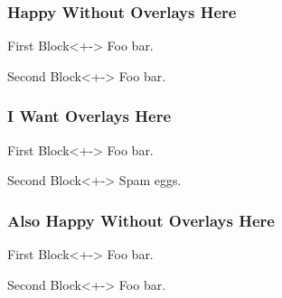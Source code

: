 \documentclass[
  handout
]{beamer}
\begin{document}
\begin{frame}

  \frametitle{Happy Without Overlays Here}

  \begin{block}{First Block}<+->
    Foo bar.
  \end{block}

  \begin{block}{Second Block}<+->
    Foo bar.
  \end{block}

\end{frame}

{

\makeatletter
  \def\beamer@currentmode{beamer}
\makeatother

\begin{frame}

  \frametitle{I Want Overlays Here}

  \begin{block}{First Block}<+->
    Foo \pause bar.
  \end{block}

  \begin{block}{Second Block}<+->
    Spam \pause eggs.
  \end{block}

\end{frame}
}

\begin{frame}

  \frametitle{Also Happy Without Overlays Here}
  
  \begin{block}{First Block}<+->
    Foo bar.
  \end{block}

  \begin{block}{Second Block}<+->
    Foo bar.
  \end{block}

\end{frame}
\end{document}
